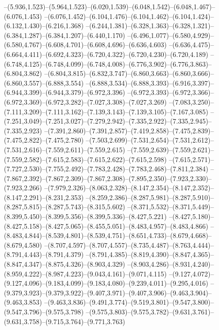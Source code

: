   --(5.936,1.523)--(5.964,1.523)--(6.020,1.539)--(6.048,1.542)--(6.048,1.467)--(6.076,1.453)%
  --(6.076,1.452)--(6.104,1.476)--(6.104,1.462)--(6.104,1.424)--(6.132,1.430)--(6.216,1.368)%
  --(6.244,1.381)--(6.328,1.363)--(6.328,1.321)--(6.384,1.287)--(6.384,1.207)--(6.440,1.170)%
  --(6.496,1.077)--(6.580,4.929)--(6.580,4.767)--(6.608,4.701)--(6.608,4.696)--(6.636,4.603)%
  --(6.636,4.475)--(6.664,4.411)--(6.692,4.323)--(6.720,4.322)--(6.720,4.230)--(6.720,4.189)%
  --(6.748,4.125)--(6.748,4.099)--(6.748,4.008)--(6.776,3.902)--(6.776,3.863)--(6.804,3.862)%
  --(6.804,3.815)--(6.832,3.747)--(6.860,3.663)--(6.860,3.666)--(6.860,3.557)--(6.888,3.554)%
  --(6.888,3.534)--(6.888,3.393)--(6.916,3.397)--(6.944,3.399)--(6.944,3.379)--(6.972,3.396)%
  --(6.972,3.393)--(6.972,3.366)--(6.972,3.369)--(6.972,3.282)--(7.027,3.308)--(7.027,3.269)%
  --(7.083,3.250)--(7.111,3.209)--(7.111,3.162)--(7.139,3.143)--(7.139,3.105)--(7.167,3.085)%
  --(7.251,3.049)--(7.251,3.027)--(7.279,2.942)--(7.335,2.922)--(7.335,2.945)--(7.335,2.923)%
  --(7.391,2.860)--(7.391,2.857)--(7.419,2.858)--(7.475,2.839)--(7.475,2.822)--(7.475,2.780)%
  --(7.503,2.699)--(7.531,2.654)--(7.531,2.612)--(7.531,2.616)--(7.559,2.611)--(7.559,2.615)%
  --(7.559,2.639)--(7.559,2.621)--(7.559,2.582)--(7.615,2.583)--(7.615,2.622)--(7.615,2.598)%
  --(7.615,2.571)--(7.727,2.530)--(7.755,2.492)--(7.783,2.428)--(7.783,2.468)--(7.811,2.384)%
  --(7.867,2.392)--(7.867,2.309)--(7.867,2.308)--(7.895,2.350)--(7.923,2.330)--(7.923,2.266)%
  --(7.979,2.326)--(8.063,2.328)--(8.147,2.354)--(8.147,2.352)--(8.147,2.291)--(8.231,2.353)%
  --(8.259,2.386)--(8.287,5.981)--(8.287,5.910)--(8.287,5.815)--(8.287,5.743)--(8.315,5.602)%
  --(8.371,5.532)--(8.371,5.449)--(8.399,5.450)--(8.399,5.356)--(8.399,5.336)--(8.427,5.221)%
  --(8.427,5.180)--(8.427,5.158)--(8.427,5.065)--(8.455,5.051)--(8.483,4.957)--(8.483,4.866)%
  --(8.483,4.844)--(8.539,4.801)--(8.539,4.751)--(8.651,4.733)--(8.679,4.668)--(8.679,4.580)%
  --(8.707,4.597)--(8.707,4.557)--(8.735,4.487)--(8.763,4.444)--(8.791,4.443)--(8.791,4.379)%
  --(8.791,4.385)--(8.819,4.390)--(8.847,4.365)--(8.847,4.347)--(8.875,4.326)--(8.903,4.329)%
  --(8.903,4.286)--(8.931,4.240)--(8.959,4.222)--(8.987,4.223)--(9.043,4.161)--(9.071,4.115)%
  --(9.127,4.072)--(9.127,4.096)--(9.183,4.099)--(9.183,4.080)--(9.239,4.011)--(9.295,4.016)%
  --(9.379,3.923)--(9.379,3.922)--(9.407,3.971)--(9.407,3.906)--(9.463,3.904)--(9.463,3.853)%
  --(9.463,3.836)--(9.491,3.774)--(9.519,3.801)--(9.547,3.800)--(9.547,3.796)--(9.575,3.798)%
  --(9.575,3.803)--(9.575,3.782)--(9.631,3.761)--(9.631,3.758)--(9.715,3.764)--(9.771,3.763)%
